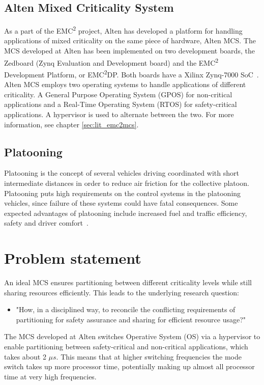 \subsection{Alten Mixed Criticality System}
\label{sec:mces}
As a part of the EMC\textsuperscript{2} project, Alten has developed a platform for handling applications of mixed criticality on the same piece of hardware, Alten MCS. The MCS developed at Alten has been implemented on two development boards, the Zedboard (Zynq Evaluation and Development board) and the EMC\textsuperscript{2} Development Platform, or EMC\textsuperscript{2}DP. Both boards have a Xilinx Zynq-7000 SoC~\cite{website:xilinx}. Alten MCS employs two operating systems to handle applications of different criticality. A General Purpose Operating System (GPOS) for non-critical applications and a Real-Time Operating System (RTOS) for safety-critical applications. A hypervisor is used to alternate between the two. For more information, see chapter \ref{sec:lit_emc2mcs}.

\subsection{Platooning}
\label{sec:platooning}
Platooning is the concept of several vehicles driving coordinated with short intermediate distances in order to reduce air friction for the collective platoon. Platooning puts high requirements on the control systems in the platooning vehicles, since failure of these systems could have fatal consequences. Some expected advantages of platooning include increased fuel and traffic efficiency, safety and driver comfort~\cite{bergenhem}.

\section{Problem statement}
\label{sec:problem}
An ideal MCS ensures partitioning between different criticality levels while still sharing resources efficiently. This leads to the underlying research question:
\begin{itemize}
\item "How, in a disciplined way, to reconcile the conflicting requirements of partitioning for safety assurance and sharing for efficient resource usage?" \cite{burns2016}
\end{itemize}
The MCS developed at Alten switches Operative System (OS) via a hypervisor to enable partitioning between safety-critical and non-critical applications, which takes about 2 $\mu s$. This means that at higher switching frequencies the mode switch takes up more processor time, potentially making up almost all processor time at very high frequencies.\\

